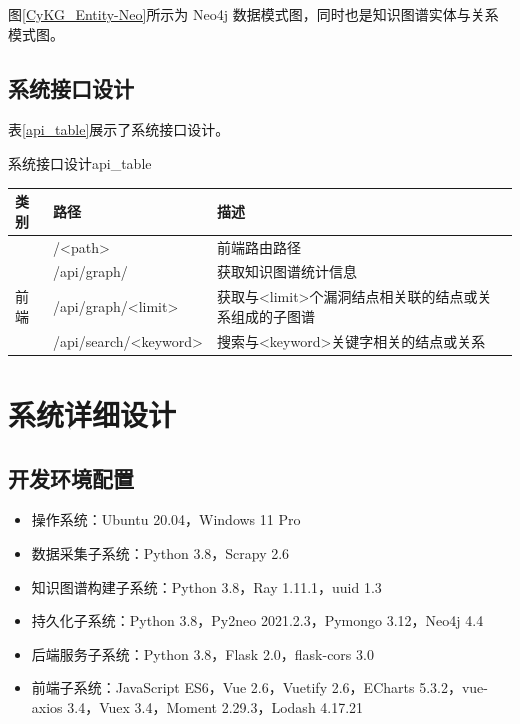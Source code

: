 \documentclass[a4paper,AutoFakeBold,oneside,12pt]{book}
\begin{document}

图\ref{CyKG_Entity-Neo}所示为 Neo4j 数据模式图，同时也是知识图谱实体与关系模式图。


\subsection{系统接口设计}

表\ref{api_table}展示了系统接口设计。
\begin{bupttable}{系统接口设计}{api_table}
	\begin{tabularx}{\textwidth}{llX}
		\toprule
		\textbf{类别} & \textbf{路径}         & \textbf{描述}                                         \\ \midrule
		              & /<path>               & 前端路由路径                                          \\ \cmidrule(l){2-3}
		              & /api/graph/           & 获取知识图谱统计信息                                  \\ \cmidrule(l){2-3}
		前端          & /api/graph/<limit>    & 获取与<limit>个漏洞结点相关联的结点或关系组成的子图谱 \\ \cmidrule(l){2-3}
		              & /api/search/<keyword> & 搜索与<keyword>关键字相关的结点或关系                 \\ \bottomrule %
	\end{tabularx}
\end{bupttable}

\section{系统详细设计}

\subsection{开发环境配置}

\begin{itemize}
	\item 操作系统：Ubuntu 20.04，Windows 11 Pro
	\item 数据采集子系统：Python 3.8，Scrapy 2.6
	\item 知识图谱构建子系统：Python 3.8，Ray 1.11.1，uuid 1.3
	\item 持久化子系统：Python 3.8，Py2neo 2021.2.3，Pymongo 3.12，Neo4j 4.4
	\item 后端服务子系统：Python 3.8，Flask 2.0，flask-cors 3.0
	\item 前端子系统：JavaScript ES6，Vue 2.6，Vuetify 2.6，ECharts 5.3.2，vue-axios 3.4，Vuex 3.4，Moment 2.29.3，Lodash 4.17.21
\end{itemize}
\end{document}
